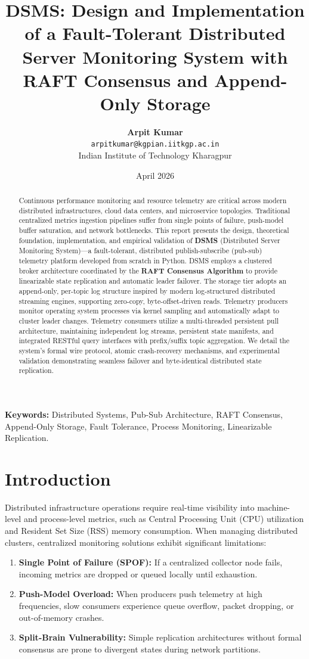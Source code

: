 \documentclass[11pt,a4paper]{article}
\title{\textbf{\Large DSMS: Design and Implementation of a Fault-Tolerant Distributed Server Monitoring System with RAFT Consensus and Append-Only Storage}}
\author{
    \textbf{Arpit Kumar} \\
    \texttt{arpitkumar@kgpian.iitkgp.ac.in} \\
    Indian Institute of Technology Kharagpur
}
\date{April 2026}
\begin{document}
\maketitle

\begin{abstract}
Continuous performance monitoring and resource telemetry are critical across modern distributed infrastructures, cloud data centers, and microservice topologies. Traditional centralized metrics ingestion pipelines suffer from single points of failure, push-model buffer saturation, and network bottlenecks. This report presents the design, theoretical foundation, implementation, and empirical validation of \textbf{DSMS} (Distributed Server Monitoring System)---a fault-tolerant, distributed publish-subscribe (pub-sub) telemetry platform developed from scratch in Python. DSMS employs a clustered broker architecture coordinated by the \textbf{RAFT Consensus Algorithm} to provide linearizable state replication and automatic leader failover. The storage tier adopts an append-only, per-topic log structure inspired by modern log-structured distributed streaming engines, supporting zero-copy, byte-offset-driven reads. Telemetry producers monitor operating system processes via kernel sampling and automatically adapt to cluster leader changes. Telemetry consumers utilize a multi-threaded persistent pull architecture, maintaining independent log streams, persistent state manifests, and integrated RESTful query interfaces with prefix/suffix topic aggregation. We detail the system's formal wire protocol, atomic crash-recovery mechanisms, and experimental validation demonstrating seamless failover and byte-identical distributed state replication.
\end{abstract}

\vspace{0.5em}
\noindent\textbf{Keywords:} Distributed Systems, Pub-Sub Architecture, RAFT Consensus, Append-Only Storage, Fault Tolerance, Process Monitoring, Linearizable Replication.

\section{Introduction}
\label{sec:introduction}
Distributed infrastructure operations require real-time visibility into machine-level and process-level metrics, such as Central Processing Unit (CPU) utilization and Resident Set Size (RSS) memory consumption. When managing distributed clusters, centralized monitoring solutions exhibit significant limitations:
\begin{enumerate}[leftmargin=*]
    \item \textbf{Single Point of Failure (SPOF):} If a centralized collector node fails, incoming metrics are dropped or queued locally until exhaustion.
    \item \textbf{Push-Model Overload:} When producers push telemetry at high frequencies, slow consumers experience queue overflow, packet dropping, or out-of-memory crashes.
    \item \textbf{Split-Brain Vulnerability:} Simple replication architectures without formal consensus are prone to divergent states during network partitions.
\end{enumerate}
\end{document}

